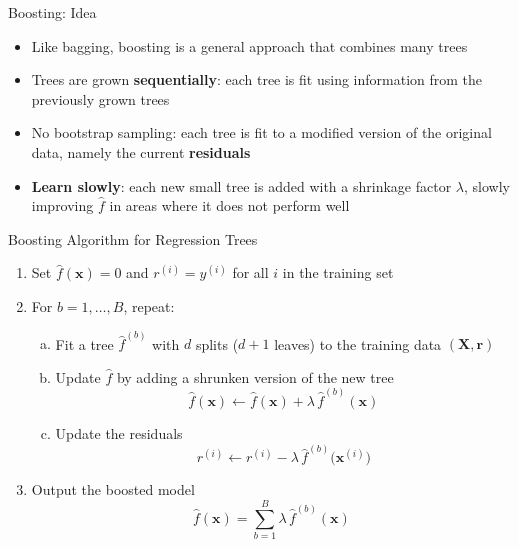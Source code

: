 \begin{frame}{Boosting: Idea}
    \begin{itemize}
        \item Like bagging, boosting is a general approach that combines many trees
        \item Trees are grown \textbf{sequentially}: each tree is fit using information from the previously grown trees
        \item No bootstrap sampling: each tree is fit to a modified version of the original data, namely the current \textbf{residuals}
        \item \textbf{Learn slowly}: each new small tree is added with a shrinkage factor $\lambda$, slowly improving $\hat{f}$ in areas where it does not perform well
    \end{itemize}
\end{frame}


\begin{frame}{Boosting Algorithm for Regression Trees}
    \begin{enumerate}
        \item Set $\hat{f}(\mathbf{x}) = 0$ and $r^{(i)} = y^{(i)}$ for all $i$ in the training set
        \item For $b = 1, \dots, B$, repeat:
        \begin{enumerate}[(a)]
            \item Fit a tree $\hat{f}^{(b)}$ with $d$ splits ($d + 1$ leaves) to the training data $(\mathbf{X}, \mathbf{r})$
            \item Update $\hat{f}$ by adding a shrunken version of the new tree
            \[
                \hat{f}(\mathbf{x}) \leftarrow \hat{f}(\mathbf{x}) + \lambda\, \hat{f}^{(b)}(\mathbf{x})
            \]
            \item Update the residuals
            \[
                r^{(i)} \leftarrow r^{(i)} - \lambda\, \hat{f}^{(b)}\big(\mathbf{x}^{(i)}\big)
            \]
        \end{enumerate}
        \item Output the boosted model
        \[
            \hat{f}(\mathbf{x}) = \sum_{b=1}^{B} \lambda\, \hat{f}^{(b)}(\mathbf{x})
        \]
    \end{enumerate}
\end{frame}


